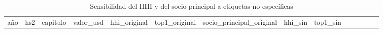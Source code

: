 \documentclass[
]{article}
\begin{document}
\begin{longtable}[]{@{}
  >{\raggedleft\arraybackslash}p{}
  >{\raggedright\arraybackslash}p{}
  >{\raggedright\arraybackslash}p{}
  >{\raggedleft\arraybackslash}p{}
  >{\raggedleft\arraybackslash}p{}
  >{\raggedleft\arraybackslash}p{}
  >{\raggedright\arraybackslash}p{}
  >{\raggedleft\arraybackslash}p{}
  >{\raggedleft\arraybackslash}p{}
  >{\raggedright\arraybackslash}p{}
  >{\raggedleft\arraybackslash}p{}
  >{\raggedleft\arraybackslash}p{}
  >{\raggedleft\arraybackslash}p{}
  >{\raggedleft\arraybackslash}p{}@{}}
\caption{Sensibilidad del HHI y del socio principal a etiquetas no
específicas}\tabularnewline
\toprule\noalign{}
\begin{minipage}[b]{\linewidth}\raggedleft
año
\end{minipage} & \begin{minipage}[b]{\linewidth}\raggedright
hs2
\end{minipage} & \begin{minipage}[b]{\linewidth}\raggedright
capitulo
\end{minipage} & \begin{minipage}[b]{\linewidth}\raggedleft
valor\_usd
\end{minipage} & \begin{minipage}[b]{\linewidth}\raggedleft
hhi\_original
\end{minipage} & \begin{minipage}[b]{\linewidth}\raggedleft
top1\_original
\end{minipage} & \begin{minipage}[b]{\linewidth}\raggedright
socio\_principal\_original
\end{minipage} & \begin{minipage}[b]{\linewidth}\raggedleft
hhi\_sin
\end{minipage} & \begin{minipage}[b]{\linewidth}\raggedleft
top1\_sin
\end{minipage} & \begin{minipage}[b]{\linewidth}\raggedright

\end{minipage}
\end{longtable}
\end{document}
